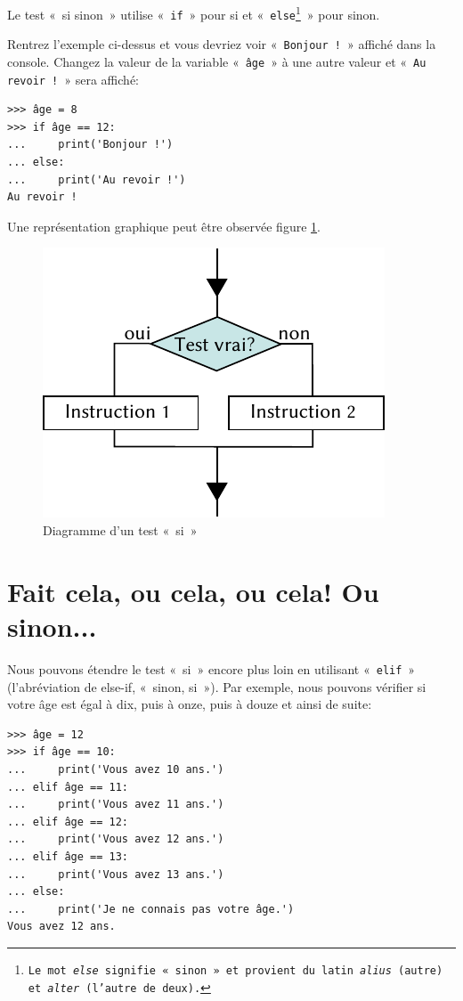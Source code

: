 Le test «~si sinon~» utilise «~\texttt{if}~» pour si et «~\texttt{else\footnote{Le mot \emph{else} signifie «~sinon~» et provient du latin \emph{alius} (autre) et \emph{alter} (l'autre de deux).}}~» pour sinon.

Rentrez l'exemple ci-dessus et vous devriez voir «~\texttt{Bonjour !}~» affiché dans la console.
Changez la valeur de la variable «~\texttt{âge}~»  à une autre valeur et «~\texttt{Au revoir !}~»  sera affiché:

\begin{Verbatim}[frame=single,rulecolor=\color{green}, label=à taper avec attention]
>>> âge = 8
>>> if âge == 12:
...     print('Bonjour !')
... else:
...     print('Au revoir !')
Au revoir !
\end{Verbatim}

Une représentation graphique peut être observée figure \ref{fig:Cf-else-fr}.

\begin{figure}[ht]
\centering
\includegraphics[scale=1.5]{images/Cf-else-fr.pdf}
\caption{Diagramme d'un test «~si~»}
\label{fig:Cf-else-fr}
\end{figure}


\section{Fait cela, ou cela, ou cela! Ou sinon...}
Nous pouvons étendre le test «~si~» encore plus loin en utilisant «~\texttt{elif}~» (l'abréviation  de else-if, «~sinon, si~»). Par exemple, nous pouvons vérifier si votre âge est égal à dix, puis à onze, puis à douze et ainsi de suite: 

\begin{Verbatim}[frame=single,rulecolor=\color{green}, label=à taper avec attention]
>>> âge = 12
>>> if âge == 10:
...     print('Vous avez 10 ans.')
... elif âge == 11:
...     print('Vous avez 11 ans.')
... elif âge == 12:
...     print('Vous avez 12 ans.')
... elif âge == 13:
...     print('Vous avez 13 ans.')
... else:
...     print('Je ne connais pas votre âge.')
Vous avez 12 ans.
\end{Verbatim}

